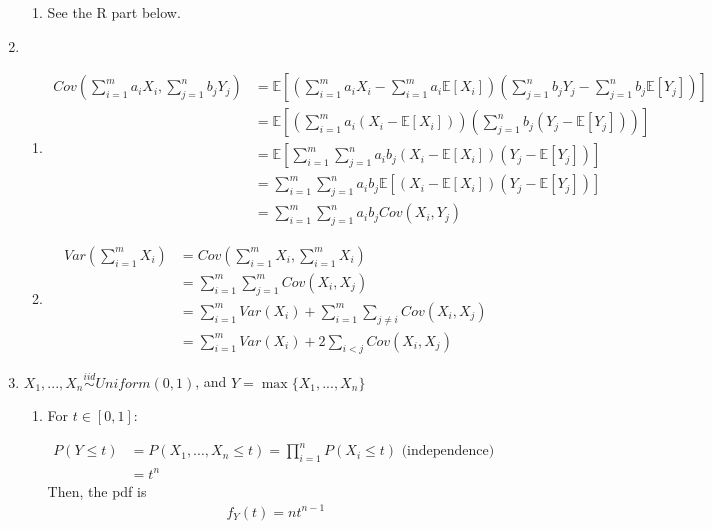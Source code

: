 \documentclass[12pt]{article}
\begin{document}
\begin{enumerate}
\begin{enumerate}
\item See the R part below.

\end{enumerate}

\item 

\begin{enumerate}
\item

\begin{align*}
Cov\left( \sum \limits_{i=1}^m a_i X_i, \sum \limits_{j=1}^n b_j Y_j \right) &= \mathbb{E}\left[ \left( \sum \limits_{i=1}^m a_i X_i - \sum \limits_{i=1}^m a_i \mathbb{E}[X_i] \right)\left(\sum \limits_{j=1}^n b_j Y_j - \sum \limits_{j=1}^n b_j \mathbb{E}[Y_j] \right) \right] \\
&= \mathbb{E}\left[ \left( \sum \limits_{i=1}^m a_i (X_i - \mathbb{E}[X_i])  \right)\left(\sum \limits_{j=1}^n b_j (Y_j - \mathbb{E}[Y_j]) \right) \right] \\
&= \mathbb{E}\left[ \sum \limits_{i=1}^m \sum \limits_{j=1}^n a_i b_j  (X_i - \mathbb{E}[X_i])(Y_j - \mathbb{E}[Y_j]) \right] \\
&= \sum \limits_{i=1}^m \sum \limits_{j=1}^n a_i b_j  \mathbb{E}\left[ (X_i - \mathbb{E}[X_i])(Y_j - \mathbb{E}[Y_j])\right] \\
&= \sum \limits_{i=1}^m \sum \limits_{j=1}^n a_i b_j  Cov(X_i, Y_j)
\end{align*}

\item 

\begin{align*}
Var \left( \sum \limits_{i=1}^m X_i \right) &= Cov \left( \sum \limits_{i=1}^m X_i, \sum \limits_{i=1}^m X_i \right) \\ 
&= \sum \limits_{i=1}^m \sum \limits_{j=1}^m Cov(X_i, X_j) \\
&= \sum \limits_{i=1}^m Var(X_i) + \sum \limits_{i=1}^m \sum \limits_{j \neq i} Cov(X_i, X_j) \\
&= \sum \limits_{i=1}^m Var(X_i) + 2 \sum \limits_{i < j} Cov(X_i, X_j)
\end{align*}
\end{enumerate}

\item $X_1,...,X_n \overset{iid}{\sim} Uniform(0, 1)$, and $Y = \max\{X_1,...,X_n\}$

\begin{enumerate}

\item For $t \in [0, 1]$:

\begin{align*}
P(Y \leq t) &= P(X_1,...,X_n \leq t) = \prod \limits_{i=1}^n P(X_i \leq t) \text{ (independence) } \\
&= t^n
\end{align*}
Then, the pdf is 
\begin{align*}
f_Y(t) = nt^{n-1}
\end{align*}

\end{enumerate}

\end{enumerate}
\end{document}
